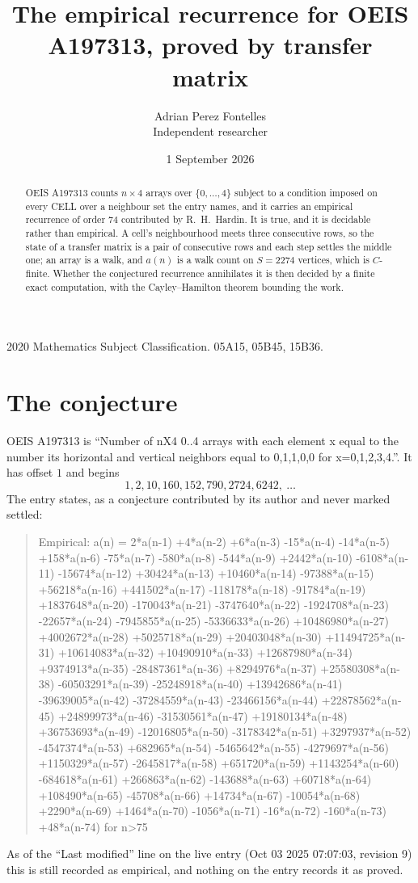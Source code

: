 \documentclass[11pt,a4paper]{article}
\title{The empirical recurrence for OEIS A197313, proved by transfer matrix}
\author{Adrian Perez Fontelles\\ \small Independent researcher}
\date{1 September 2026}
\theoremstyle{plain}
\theoremstyle{definition}
\begin{document}
\maketitle

\begin{abstract}
OEIS A197313 counts $n\times4$ arrays over $\{0,\dots,4\}$ subject to a condition imposed on
every CELL over a neighbour set the entry names, and it carries an empirical recurrence of
order $74$ contributed by R.~H.~Hardin. It is true, and it is decidable rather than
empirical. A cell's neighbourhood meets three consecutive rows, so the state of a transfer
matrix is a pair of consecutive rows and each step settles the middle one; an array is a
walk, and $a(n)$ is a walk count on $S=2274$ vertices, which is $C$-finite. Whether the
conjectured recurrence annihilates it is then decided by a finite exact computation, with the
Cayley--Hamilton theorem bounding the work.
\end{abstract}

\noindent\small 2020 Mathematics Subject Classification. 05A15, 05B45, 15B36.\normalsize

\section{The conjecture}

OEIS A197313 is ``Number of nX4 0..4 arrays with each element x equal to the number its horizontal and vertical neighbors equal to 0,1,1,0,0 for x=0,1,2,3,4.''. It has offset $1$ and begins
\[
1, 2, 10, 160, 152, 790, 2724, 6242,\ \dots
\]
The entry states, as a conjecture contributed by its author and never marked settled:
\begin{quote}
Empirical: a(n) = 2*a(n-1) +4*a(n-2) +6*a(n-3) -15*a(n-4) -14*a(n-5) +158*a(n-6) -75*a(n-7) -580*a(n-8) -544*a(n-9) +2442*a(n-10) -6108*a(n-11) -15674*a(n-12) +30424*a(n-13) +10460*a(n-14) -97388*a(n-15) +56218*a(n-16) +441502*a(n-17) -118178*a(n-18) -91784*a(n-19) +1837648*a(n-20) -170043*a(n-21) -3747640*a(n-22) -1924708*a(n-23) -22657*a(n-24) -7945855*a(n-25) -5336633*a(n-26) +10486980*a(n-27) +4002672*a(n-28) +5025718*a(n-29) +20403048*a(n-30) +11494725*a(n-31) +10614083*a(n-32) +10490910*a(n-33) +12687980*a(n-34) +9374913*a(n-35) -28487361*a(n-36) +8294976*a(n-37) +25580308*a(n-38) -60503291*a(n-39) -25248918*a(n-40) +13942686*a(n-41) -39639005*a(n-42) -37284559*a(n-43) -23466156*a(n-44) +22878562*a(n-45) +24899973*a(n-46) -31530561*a(n-47) +19180134*a(n-48) +36753693*a(n-49) -12016805*a(n-50) -3178342*a(n-51) +3297937*a(n-52) -4547374*a(n-53) +682965*a(n-54) -5465642*a(n-55) -4279697*a(n-56) +1150329*a(n-57) -2645817*a(n-58) +651720*a(n-59) +1143254*a(n-60) -684618*a(n-61) +266863*a(n-62) -143688*a(n-63) +60718*a(n-64) +108490*a(n-65) -45708*a(n-66) +14734*a(n-67) -10054*a(n-68) +2290*a(n-69) +1464*a(n-70) -1056*a(n-71) -16*a(n-72) -160*a(n-73) +48*a(n-74) for n>75
\end{quote}
As of the ``Last modified'' line on the live entry (Oct 03 2025 07:07:03, revision 9) this is still
recorded as empirical, and nothing on the entry records it as proved.
\end{document}
